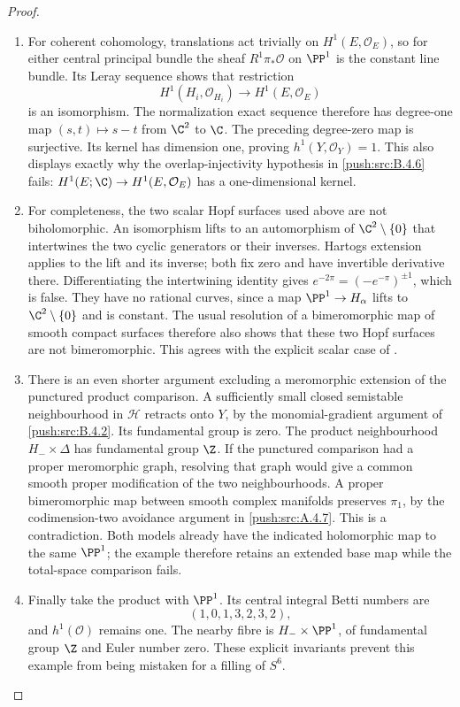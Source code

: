 \begin{proof}
\begin{enumerate}[label=\arabic*.,leftmargin=*]
\item For coherent cohomology, translations act trivially on
$H^1(E,\mathcal O_E)$, so for either central principal bundle
the sheaf $R^1\pi_*\mathcal O$ on $\PP^1$ is the constant
line bundle.  Its Leray sequence shows that restriction
\[
 H^1(H_i,\mathcal O_{H_i})\longrightarrow H^1(E,\mathcal O_E)
\]
is an isomorphism.  The normalization exact sequence therefore
has degree-one map $(s,t)\mapsto s-t$ from $\C^2$ to $\C$.
The preceding degree-zero map is surjective.  Its kernel has
dimension one, proving $h^1(Y,\mathcal O_Y)=1$.
This also displays exactly why the overlap-injectivity hypothesis
in \ref{push:src:B.4.6} fails: $H^1(E;\C)\to H^1(E,\mathcal O_E)$ has a
one-dimensional kernel.

\item For completeness, the two scalar Hopf surfaces used above are
not biholomorphic.  An isomorphism lifts to an automorphism of
$\C^2\setminus\{0\}$ that intertwines the two cyclic generators
or their inverses.  Hartogs extension applies to the lift and
its inverse; both fix zero and have invertible derivative there.
Differentiating the intertwining identity gives
$e^{-2\pi}=(-e^{-\pi})^{\pm1}$, which is false.  They have
no rational curves, since a map $\PP^1\to H_\alpha$ lifts to
$\C^2\setminus\{0\}$ and is constant.  The usual resolution
of a bimeromorphic map of smooth compact surfaces therefore
also shows that these two Hopf surfaces are not bimeromorphic.
This agrees with the explicit scalar case of
\citet[Section 2.2]{AbashevaDeev2024AB}.

\item There is an even shorter argument excluding a meromorphic
extension of the punctured product comparison.  A sufficiently
small closed semistable neighbourhood in $\mathcal H$ retracts
onto $Y$, by the monomial-gradient argument of \ref{push:src:B.4.2}.  Its
fundamental group is zero.  The product neighbourhood
$H_-\times\Delta$ has fundamental group $\Z$.  If the
punctured comparison had a proper meromorphic graph, resolving
that graph would give a common smooth proper modification of
the two neighbourhoods.  A proper bimeromorphic map between
smooth complex manifolds preserves $\pi_1$, by the
codimension-two avoidance argument in \ref{push:src:A.4.7}.  This is a
contradiction.  Both models already have the indicated
holomorphic map to the same $\PP^1$; the example therefore
retains an extended base map while the total-space comparison
fails.

\item Finally take the product with $\PP^1$.  Its central integral
Betti numbers are
\[
 (1,0,1,3,2,3,2),
\]
and $h^1(\mathcal O)$ remains one.  The nearby fibre is
$H_-\times\PP^1$, of fundamental group $\Z$ and Euler
number zero.  These explicit invariants prevent this example
from being mistaken for a filling of $S^6$.
\end{enumerate}
\end{proof}



